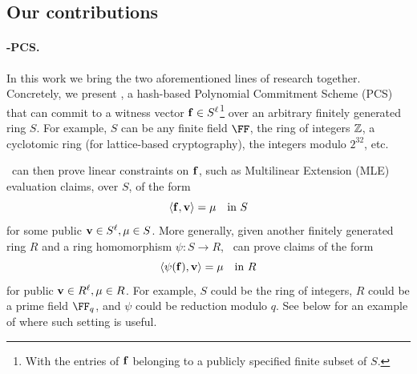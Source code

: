 \subsection{Our contributions}\label{s:intro_contributions}


\paragraph{\ftwoz-PCS.} In this work we bring the  two aforementioned lines of research together. Concretely, we  present \ftwoz, a hash-based Polynomial Commitment Scheme (PCS) that can commit to a witness vector $\mathbf{f} \in S^\ell$\footnote{With the entries of $\mathbf{f}$ belonging to a publicly specified finite subset of $S$.} over an arbitrary finitely generated ring $S$. For example, $S$ can be any finite field $\FF$, the ring of integers $\mathbb{Z}$, a cyclotomic ring (for lattice-based cryptography), the integers modulo $2^{32}$, etc.

 \ftwoz \ can then prove linear constraints on $\mathbf{f}$, such as Multilinear Extension (MLE) evaluation claims, over $S$, of the form $$\langle \mathbf{f}, \mathbf{v}\rangle = \mu \quad \text{in } S$$ for some public $\mathbf{v}\in S^\ell, \mu\in S$.
 More generally, given another finitely generated ring $R$ and a ring homomorphism $\psi: S\to R$, \ftwoz\ can prove claims of the form $$\langle \psi(\mathbf{f}), \mathbf{v}\rangle = \mu \quad \text{in } R$$ for public $\mathbf{v}\in R^{\ell}, \mu\in R$. For example, $S$ could be the ring of integers, $R$ could be a prime field $\FF_q$, and $\psi$ could be reduction modulo $q$. See below for an example of where such setting is useful. 

\medskip

